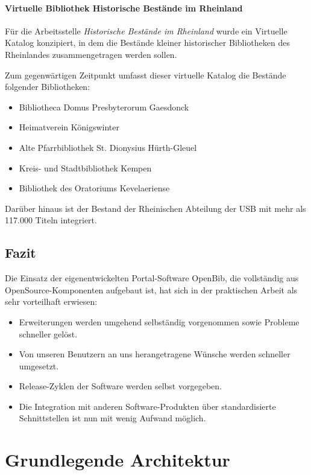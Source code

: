 \documentclass[11pt, twoside, a4paper, BCOR8mm, DIV12, bibtotoc,idxtotoc]{scrbook}
\begin{document}
\subsubsection{Virtuelle Bibliothek Historische Bestände im Rheinland}

Für die Arbeitsstelle \emph{Historische Bestände im Rheinland} wurde
ein Virtuelle Katalog konzipiert, in dem die Bestände kleiner
historischer Bibliotheken des Rheinlandes zusammengetragen werden
sollen.

Zum gegenwärtigen Zeitpunkt umfasst dieser virtuelle Katalog die Bestände folgender Bibliotheken:

\begin{itemize}
\item Bibliotheca Domus Presbyterorum Gaesdonck
\item Heimatverein Königswinter
\item Alte Pfarrbibliothek St. Dionysius Hürth-Gleuel
\item Kreis- und Stadtbibliothek Kempen
\item Bibliothek des Oratoriums Kevelaeriense
\end{itemize}

Darüber hinaus ist der Bestand der Rheinischen Abteilung der USB mit
mehr als 117.000 Titeln integriert.

\section{Fazit}

Die Einsatz der eigenentwickelten Portal-Software OpenBib, die
vollständig aus OpenSource-Komponenten aufgebaut ist, hat sich in der
praktischen Arbeit als sehr vorteilhaft erwiesen:

\begin{itemize}
\item Erweiterungen werden umgehend selbständig vorgenommen sowie
  Probleme schneller gelöst.
\item Von unseren Benutzern an uns herangetragene Wünsche werden
  schneller umgesetzt.
\item Release-Zyklen der Software werden selbst vorgegeben.
\item Die Integration mit anderen Software-Produkten über
  standardisierte Schnittstellen ist nun mit wenig Aufwand möglich.
\end{itemize}
    
\chapter{Grundlegende Architektur}
\end{document}
